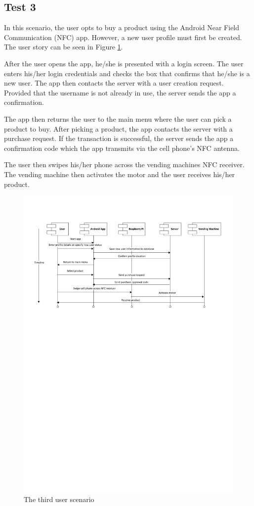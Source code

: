 \subsection{Test 3}

In this scenario, the user opts to buy a product using the Android Near Field
Communication (NFC) app. However, a new user profile must first be created. The user story
can be seen in Figure \ref{fig:test3}.

After the user opens the app, he/she is presented with a login screen. The user enters
his/her login credentials and checks the box that confirms that he/she is a new user. The
app then contacts the server with a user creation request. Provided that the username is
not already in use, the server sends the app a confirmation.

The app then returns the user to the main menu where the user can pick a product to buy.
After picking a product, the app contacts the server with a purchase request. If the
transaction is successful, the server sends the app a confirmation code which the app 
transmits via the cell phone's NFC antenna. 

The user then swipes his/her phone across the vending machines NFC receiver. The vending
machine then activates the motor and the user receives his/her product. 

\begin{figure}
 \centering 
 \includegraphics[clip=true, trim = 0 500 0 50,
 scale=0.7]{user_story_3}
 \caption{The third user scenario}
 \label{fig:test3}
\end{figure}